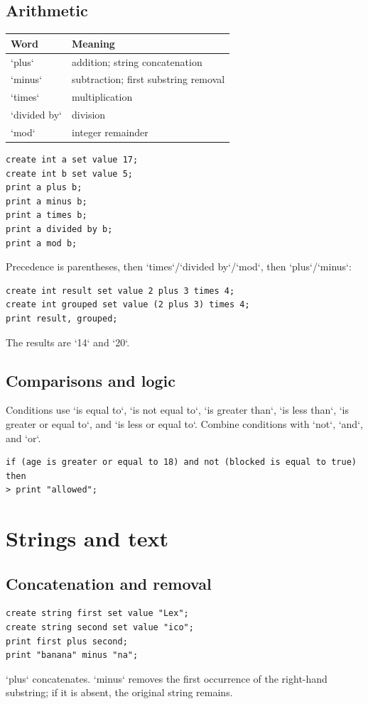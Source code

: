 \documentclass[10.5pt,a4paper]{article}
\begin{document}
\subsection{Arithmetic}
\begin{tabularx}{\textwidth}{l X}\toprule Word & Meaning\\\midrule
`plus` & addition; string concatenation\\
`minus` & subtraction; first substring removal\\
`times` & multiplication\\
`divided by` & division\\
`mod` & integer remainder\\\bottomrule\end{tabularx}
\begin{lstlisting}
create int a set value 17;
create int b set value 5;
print a plus b;
print a minus b;
print a times b;
print a divided by b;
print a mod b;
\end{lstlisting}
Precedence is parentheses, then `times`/`divided by`/`mod`, then `plus`/`minus`:
\begin{lstlisting}
create int result set value 2 plus 3 times 4;
create int grouped set value (2 plus 3) times 4;
print result, grouped;
\end{lstlisting}
The results are `14` and `20`.
\subsection{Comparisons and logic}
Conditions use `is equal to`, `is not equal to`, `is greater than`, `is less than`, `is greater or equal to`, and `is less or equal to`. Combine conditions with `not`, `and`, and `or`.
\begin{lstlisting}
if (age is greater or equal to 18) and not (blocked is equal to true) then
> print "allowed";
\end{lstlisting}
\section{Strings and text}
\subsection{Concatenation and removal}
\begin{lstlisting}
create string first set value "Lex";
create string second set value "ico";
print first plus second;
print "banana" minus "na";
\end{lstlisting}
`plus` concatenates. `minus` removes the first occurrence of the right-hand substring; if it is absent, the original string remains.
\end{document}
